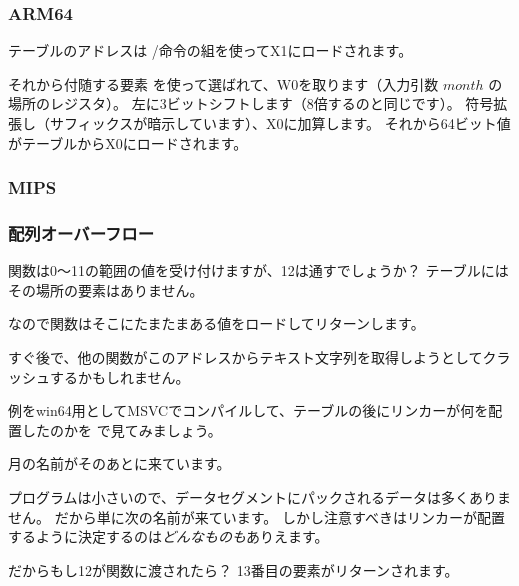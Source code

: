 \subsubsection{ARM64}




テーブルのアドレスは \ADRP/\ADD 命令の組を使ってX1にロードされます。

それから付随する要素 \LDR を使って選ばれて、W0を取ります（入力引数 $month$ の場所のレジスタ）。
左に3ビットシフトします（8倍するのと同じです）。
符号拡張し（サフィックスが暗示しています）、X0に加算します。
それから64ビット値がテーブルからX0にロードされます。

\subsubsection{MIPS}



\subsubsection{配列オーバーフロー}

関数は0～11の範囲の値を受け付けますが、12は通すでしょうか？
テーブルにはその場所の要素はありません。

なので関数はそこにたまたまある値をロードしてリターンします。

すぐ後で、他の関数がこのアドレスからテキスト文字列を取得しようとしてクラッシュするかもしれません。

例をwin64用としてMSVCでコンパイルして、テーブルの後にリンカーが何を配置したのかを \IDA で見てみましょう。



月の名前がそのあとに来ています。

プログラムは小さいので、データセグメントにパックされるデータは多くありません。
だから単に次の名前が来ています。
しかし注意すべきはリンカーが配置するように決定するのは\emph{どんなものも}ありえます。

だからもし12が関数に渡されたら？
13番目の要素がリターンされます。

